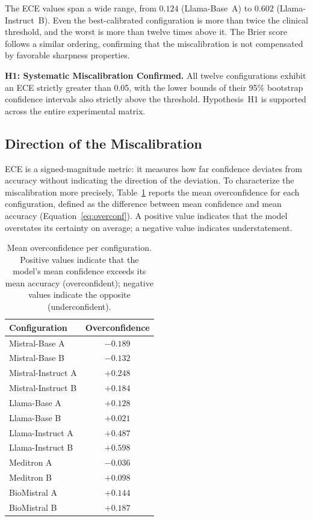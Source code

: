The ECE values span a wide range, from $0.124$ (Llama-Base~A) to $0.602$ 
(Llama-Instruct~B). Even the best-calibrated configuration is more than 
twice the clinical threshold, and the worst is more than twelve times 
above it. The Brier score follows a similar ordering, confirming that 
the miscalibration is not compensated by favorable sharpness properties.

\medskip
\noindent\textbf{H1: Systematic Miscalibration Confirmed.}
All twelve configurations exhibit an ECE strictly greater than 0.05, 
with the lower bounds of their 95\% bootstrap confidence intervals 
also strictly above the threshold. Hypothesis~H1 is supported across 
the entire experimental matrix.
\medskip

\subsection{Direction of the Miscalibration}
\label{subsec:res-h1-direction}

ECE is a signed-magnitude metric: it measures how far confidence deviates 
from accuracy without indicating the direction of the deviation. To 
characterize the miscalibration more precisely, Table~\ref{tab:res-overconf} 
reports the mean overconfidence for each configuration, defined as the 
difference between mean confidence and mean accuracy 
(Equation~\ref{eq:overconf}). A positive value indicates that the model 
overstates its certainty on average; a negative value indicates 
understatement.

\begin{table}[htbp]
    \centering
    \caption{Mean overconfidence per configuration. Positive values 
        indicate that the model's mean confidence exceeds its mean 
        accuracy (overconfident); negative values indicate the opposite 
        (underconfident).}
    \label{tab:res-overconf}
    \small
    \begin{tabular}{@{}lc@{}}
        \toprule
        \textbf{Configuration} & \textbf{Overconfidence} \\
        \midrule
        Mistral-Base A     & $-0.189$ \\
        Mistral-Base B     & $-0.132$ \\
        Mistral-Instruct A & $+0.248$ \\
        Mistral-Instruct B & $+0.184$ \\
        Llama-Base A       & $+0.128$ \\
        Llama-Base B       & $+0.021$ \\
        Llama-Instruct A   & $+0.487$ \\
        Llama-Instruct B   & $+0.598$ \\
        Meditron A         & $-0.036$ \\
        Meditron B         & $+0.098$ \\
        BioMistral A       & $+0.144$ \\
        BioMistral B       & $+0.187$ \\
        \bottomrule
    \end{tabular}
\end{table}

